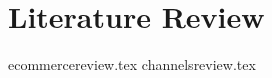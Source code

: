 \section{Literature Review}
\label{sec:literaturereview}
  {ecommercereview.tex}
  {channelsreview.tex}
